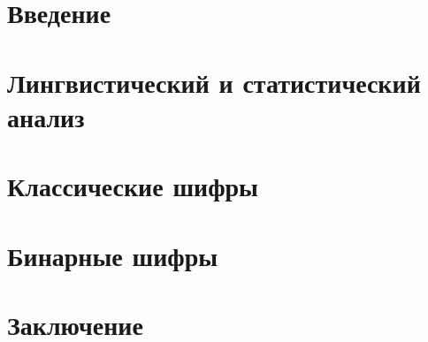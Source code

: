 \documentclass[unicode,12pt,a4paper,oneside,fleqn]{article}
\begin{document}
    
    
    \tableofcontents
    \pagebreak

    \section{Введение}
    
    \pagebreak
    
    \section{Лингвистический и статистический анализ}
    
    
    
    
    
    
    \pagebreak

    \section{Классические шифры}
    
    
    
    
    
    \pagebreak

    \section{Бинарные шифры}
    
    
    
    \pagebreak

    \section{Заключение}
    
    
    
\end{document}
